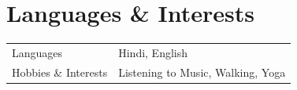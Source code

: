 \documentclass[a4paper,10pt]{article}
\newcommand{\customHeading}[1]{
    \section{\texorpdfstring{#1 \hrulefill}{}}
}
\begin{document}
\customHeading{Languages \& Interests}
\begin{tabularx}{\linewidth}{@{}l X@{}}
Languages &  \normalsize{Hindi, English}\\

Hobbies \& Interests  &  \normalsize{Listening to Music, Walking, Yoga}\\
\end{tabularx}


\vfill
\end{document}
